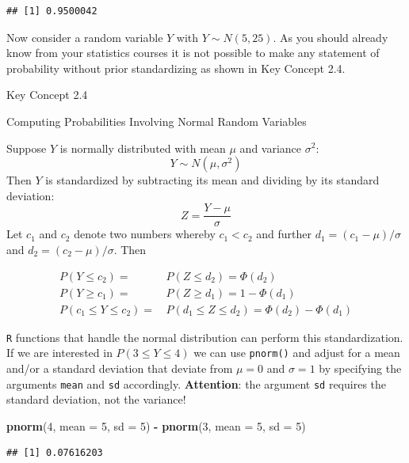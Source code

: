 \documentclass[]{book}
\newenvironment{Shaded}{\begin{snugshade}}{\end{snugshade}}
\newcommand{\KeywordTok}[1]{\textcolor[rgb]{0.13,0.29,0.53}{\textbf{#1}}}
\newcommand{\DataTypeTok}[1]{\textcolor[rgb]{0.13,0.29,0.53}{#1}}
\newcommand{\DecValTok}[1]{\textcolor[rgb]{0.00,0.00,0.81}{#1}}
\newcommand{\StringTok}[1]{\textcolor[rgb]{0.31,0.60,0.02}{#1}}
\newcommand{\OperatorTok}[1]{\textcolor[rgb]{0.81,0.36,0.00}{\textbf{#1}}}
\newcommand{\NormalTok}[1]{#1}
\theoremstyle{definition}
\theoremstyle{definition}
\theoremstyle{definition}
\theoremstyle{remark}
\begin{document}
\begin{verbatim}
## [1] 0.9500042
\end{verbatim}

Now consider a random variable \(Y\) with \(Y \sim N(5, 25)\). As you
should already know from your statistics courses it is not possible to
make any statement of probability without prior standardizing as shown
in Key Concept 2.4.

Key Concept 2.4

Computing Probabilities Involving Normal Random Variables

Suppose \(Y\) is normally distributed with mean \(\mu\) and variance
\(\sigma^2\): \[Y
\sim N(\mu, \sigma^2)\] Then \(Y\) is standardized by subtracting its
mean and dividing by its standard deviation:
\[ Z = \frac{Y -\mu}{\sigma} \] Let \(c_1\) and \(c_2\) denote two
numbers whereby \(c_1 < c_2\) and further \(d_1 = (c_1 - \mu) / \sigma\)
and \(d_2 = (c_2 - \mu)/\sigma\). Then

\begin{align} 
P(Y \leq c_2) =& \, P(Z \leq d_2) = \Phi(d_2) \\ 
P(Y \geq c_1) =& \, P(Z \geq d_1) = 1 - \Phi(d_1) \\ 
P(c_1 \leq Y \leq c_2) =& \, P(d_1 \leq Z \leq d_2) = \Phi(d_2) - \Phi(d_1) 
\end{align}

\texttt{R} functions that handle the normal distribution can perform
this standardization. If we are interested in \(P(3 \leq Y \leq 4)\) we
can use \texttt{pnorm()} and adjust for a mean and/or a standard
deviation that deviate from \(\mu=0\) and \(\sigma = 1\) by specifying
the arguments \texttt{mean} and \texttt{sd} accordingly.
\textbf{Attention}: the argument \texttt{sd} requires the standard
deviation, not the variance!

\begin{Shaded}
\begin{Highlighting}[]
\KeywordTok{pnorm}\NormalTok{(}\DecValTok{4}\NormalTok{, }\DataTypeTok{mean =} \DecValTok{5}\NormalTok{, }\DataTypeTok{sd =} \DecValTok{5}\NormalTok{) }\OperatorTok{-}\StringTok{ }\KeywordTok{pnorm}\NormalTok{(}\DecValTok{3}\NormalTok{, }\DataTypeTok{mean =} \DecValTok{5}\NormalTok{, }\DataTypeTok{sd =} \DecValTok{5}\NormalTok{) }
\end{Highlighting}
\end{Shaded}

\begin{verbatim}
## [1] 0.07616203
\end{verbatim}
\end{document}
